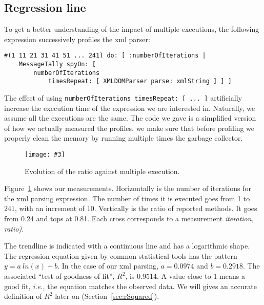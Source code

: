 \documentclass{sig-alternate}
\newcommand{\ct}{\lstinline[backgroundcolor=\color{white},basicstyle=\footnotesize\ttfamily]}
\newcommand{\fig}[4]{
	\begin{figure}[#1]
		\centering
		\texttt{[image: \#3]}
		\caption{\label{fig:#3}#4}
	\end{figure}}
\newcommand{\ie}{\emph{i.e.,}\xspace}
\newcommand{\secref}[1]{Section~\ref{sec:#1}}
\newcommand{\figref}[1]{Figure~\ref{fig:#1}}
\begin{document}
\subsection{Regression line}

To get a better understanding of the impact of multiple executions, the following expression successively profiles the xml parser:

\begin{lstlisting}
#(1 11 21 31 41 51 ... 241) do: [ :numberOfIterations |
	MessageTally spyOn: [  
		numberOfIterations 
			timesRepeat: [ XMLDOMParser parse: xmlString ] ] ]
\end{lstlisting}

The effect of using \ct{numberOfIterations timesRepeat: [ ... ]} artificially increase the execution time of the expression we are interested in. Naturally, we assume all the executions are the same. The code we gave is a simplified version of how we actually measured the profiles. we make sure that before profiling we properly clean the memory by running multiple times the garbage collector.

%

\fig{h}{0.5}{IterationEvolution}{Evolution of the ratio against multiple execution.}

\figref{IterationEvolution} shows our measurements. Horizontally is the number of iterations for the xml parsing expression. The number of times it is executed goes from 1 to 241, with an increment of 10. Vertically is the ratio of reported methods. It goes from 0.24 and tops at 0.81. Each cross corresponds to a measurement \textit{iteration, ratio)}.

The trendline is indicated with a continuous line and has a logarithmic shape. The regression equation given by common statistical tools has the pattern $y = a~ln(x) + b$. In the case of our xml parsing, $a = 0.0974$ and $b = 0.2918$. The associated ``test of goodness of fit'', $R^2$, is 0.9514. A value close to 1 means a good fit, \ie the equation matches the observed data. We will gives an accurate definition of $R^2$ later on (\secref{rSquared}).
\end{document}
